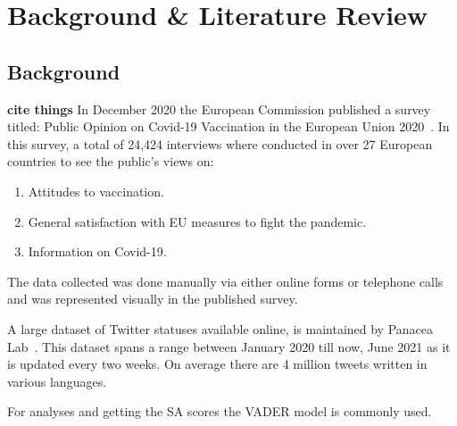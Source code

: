 \chapter{Background \& Literature Review}

\section{Background}
\textbf{cite things}
In December 2020 the European Commission published a survey titled: Public Opinion on Covid-19 Vaccination in the European Union 2020~\citep{eupublicopinion}.
In this survey, a total of 24,424 interviews where conducted in over 27 European countries to see the public's views on:

\begin{enumerate}
  \item Attitudes to vaccination.
  \item General satisfaction with EU measures to fight the pandemic.
  \item Information on Covid-19.
\end{enumerate}

\noindent The data collected was done manually via either online forms or telephone calls and was represented visually in the published survey.

A large dataset of Twitter statuses available online, is maintained by Panacea Lab~\citep{banda2020largescale}.
This dataset spans a range between January 2020 till now, June 2021 as it is updated every two weeks.
On average there are 4 million tweets written in various languages.

For analyses and getting the \ac{SA} scores the \ac{VADER} model is commonly used.

%
%
%
%

